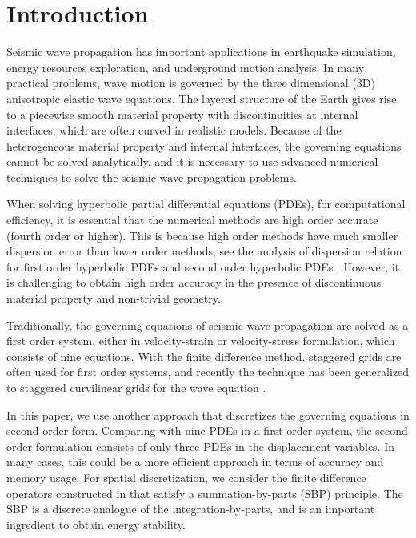 \section{Introduction}
Seismic wave propagation has important applications in earthquake simulation, energy resources exploration, and underground motion analysis. In many practical problems, wave motion is governed by the three dimensional (3D) anisotropic elastic wave equations. The layered structure of the Earth gives rise to a piecewise smooth material property with discontinuities at internal interfaces, which are often curved in realistic models. Because of the heterogeneous material property and internal interfaces, the governing equations cannot be solved analytically, and it is necessary to use advanced numerical techniques to solve the seismic wave propagation problems.

When solving hyperbolic partial differential equations (PDEs), for computational efficiency, it is essential that the numerical methods are high order accurate (fourth order or higher). This is because high order methods have much smaller dispersion error than lower order methods, see the analysis of dispersion relation for first order hyperbolic PDEs \cite{Kreiss1972} and second order hyperbolic PDEs \cite{Hagstrom2012}. However, it is challenging to obtain high order accuracy in the presence of discontinuous material property and non-trivial geometry. 

Traditionally, the governing equations of seismic wave propagation are solved as a first order system, either in velocity-strain or velocity-stress formulation, which consists of nine equations. With the finite difference method, staggered grids are often used for first order systems, and recently the technique has been generalized to staggered curvilinear grids for the wave equation \cite{OReilly2020}.

In this paper, we use another approach that discretizes the governing equations in second order form. Comparing with nine PDEs in a first order system, the second order formulation consists of only three PDEs in the displacement variables. In many cases, this could be a more efficient approach in terms of accuracy and memory usage. For spatial discretization, we consider the finite difference operators constructed in \cite{sjogreen2012fourth} that satisfy a summation-by-parts (SBP) principle. The SBP is a discrete analogue of the integration-by-parts, and is an important ingredient to obtain energy stability. 

